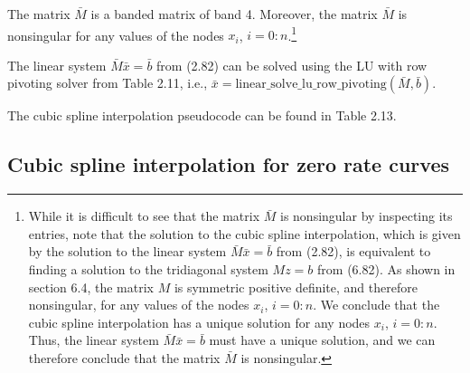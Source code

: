The matrix $\bar M$ is a banded matrix of band 4. Moreover, the matrix $\bar M$ is
nonsingular for any values of the nodes $x_i$, $i=0:n$.\footnote{While it is
difficult to see that the matrix $\bar M$ is nonsingular by inspecting its
entries, note that the solution to the cubic spline interpolation, which is given
by the solution to the linear system $\bar M\bar x=\bar b$ from (2.82), is
equivalent to finding a solution to the tridiagonal system $Mz=b$ from (6.82). As
shown in section 6.4, the matrix $M$ is symmetric positive definite, and therefore
nonsingular, for any values of the nodes $x_i$, $i=0:n$. We conclude that the cubic spline
interpolation has a unique solution for any nodes $x_i$, $i=0:n$. Thus, the linear
system $\bar M\bar x=\bar b$ must have a unique solution, and we can therefore
conclude that the matrix $\bar M$ is nonsingular.}

The linear system $\bar M\bar x=\bar b$ from (2.82) can be solved using the LU with
row pivoting solver from Table 2.11, i.e., $\bar x =
\text{linear\_solve\_lu\_row\_pivoting}(\bar M,\bar b)$.

The cubic spline interpolation pseudocode can be found in Table 2.13.

\begin{table}[H]
\centering
\caption{Pseudocode for the natural cubic spline interpolation}
\end{table}

\subsection{Cubic spline interpolation for zero rate curves}

